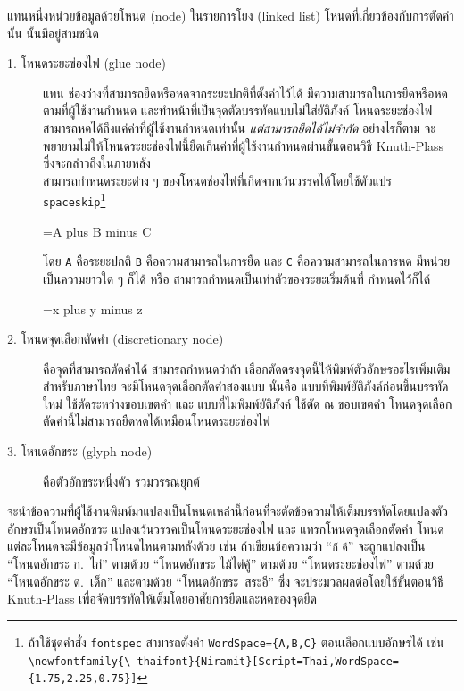 \texlogo แทนหนึ่งหน่วยข้อมูลด้วยโหนด (node) ในรายการโยง (linked list)
โหนดที่เกี่ยวข้องกับการตัดคำนั้น นั้นมีอยู่สามชนิด
\begin{description}
  \item[1. โหนดระยะช่องไฟ (glue node)] แทน
        ช่องว่างที่สามารถยืดหรือหดจากระยะปกติที่ตั้งค่าไว้ได้
        มีความสามารถในการยืดหรือหดตามที่ผู้ใช้งานกำหนด
        และทำหน้าที่เป็นจุดตัดบรรทัดแบบไม่ใส่ยัติภังค์ \texlogo
        โหนดระยะช่องไฟสามารถหดได้ถึงแค่ค่าที่ผู้ใช้งานกำหนดเท่านั้น
        \emph{แต่สามารถยืดได้ไม่จำกัด} อย่างไรก็ตาม \texlogo
        จะพยายามไม่ให้โหนดระยะช่องไฟนี้ยืดเกินค่าที่ผู้ใช้งานกำหนดผ่านขั้นตอนวิธี
        Knuth-Plass ซึ่งจะกล่าวถึงในภายหลัง \\
        สามารถกำหนดระยะต่าง ๆ ของโหนดช่องไฟที่เกิดจากเว้นวรรคได้โดยใช้ตัวแปร
        \texttt{spaceskip}\footnote{ถ้าใช้ชุดคำสั่ง \texttt{fontspec}
        สามารถตั้งค่า \texttt{WordSpace=\{A,B,C\}} ตอนเลือกแบบอักษรได้ เช่น
        \texttt{\textbackslash newfontfamily\{\textbackslash
          thaifont\}\{Niramit\}[Script=Thai,WordSpace=\{1.75,2.25,0.75\}]}}
        \begin{texsource}{}
\spaceskip=A plus B minus C
        \end{texsource}
        โดย \texttt{A} คือระยะปกติ \texttt{B} คือความสามารถในการยืด และ
        \texttt{C} คือความสามารถในการหด มีหน่วยเป็นความยาวใด ๆ ก็ได้ หรือ
        สามารถกำหนดเป็นเท่าตัวของระยะเริ่มต้นที่ \texlogo กำหนดไว้ก็ได้
        \begin{texsource}{}
\spaceskip=x plus y minus z
        \end{texsource}
  \item[2. โหนดจุดเลือกตัดคำ (discretionary node)] คือจุดที่สามารถตัดคำได้
        สามารถกำหนดว่าถ้า \texlogo
        เลือกตัดตรงจุดนี้ให้พิมพ์ตัวอักษรอะไรเพิ่มเติม สำหรับภาษาไทย
        จะมีโหนดจุดเลือกตัดคำสองแบบ นั่นคือ
        แบบที่พิมพ์ยัติภังค์ก่อนขึ้นบรรทัดใหม่ ใช้ตัดระหว่างขอบเขตคำ และ
        แบบที่ไม่พิมพ์ยัติภังค์ ใช้ตัด ณ ขอบเขตคำ
        โหนดจุดเลือกตัดคำนี้ไม่สามารถยืดหดได้เหมือนโหนดระยะช่องไฟ
  \item[3. โหนดอักขระ (glyph node)] คือตัวอักขระหนึ่งตัว รวมวรรณยุกต์
\end{description}
\texlogo
{}
จะนำข้อความที่ผู้ใช้งานพิมพ์มาแปลงเป็นโหนดเหล่านี้ก่อนที่จะตัดข้อความให้เต็มบรรทัดโดยแปลงตัวอักษรเป็นโหนดอักขระ
แปลงเว้นวรรคเป็นโหนดระยะช่องไฟ และ แทรกโหนดจุดเลือกตัดคำ
โหนดแต่ละโหนดจะมีข้อมูลว่าโหนดไหนตามหลังด้วย เช่น ถ้าเขียนข้อความว่า
\enquote{\texttt{ก็} \texttt{ดี}} จะถูกแปลงเป็น \enquote{โหนดอักขระ ก.~ไก่}
ตามด้วย \enquote{โหนดอักขระ ไม้ไต่คู้} ตามด้วย \enquote{โหนดระยะช่องไฟ} ตามด้วย
\enquote{โหนดอักขระ ด.~เด็ก} และตามด้วย \hbox{\enquote{โหนดอักขระ สระอี}} ซึ่ง
\texlogo จะประมวลผลต่อโดยใช้ขั้นตอนวิธี Knuth-Plass
เพื่อจัดบรรทัดให้เต็มโดยอาศัยการยืดและหดของจุดยืด

